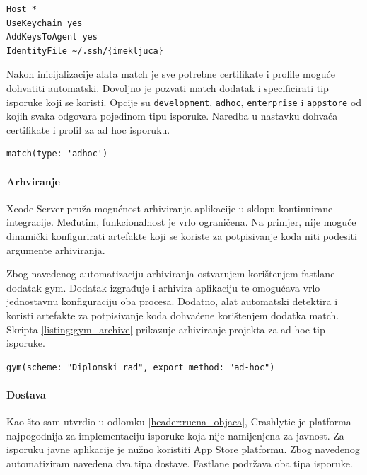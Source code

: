 \documentclass[times, utf8, diplomski, numeric]{fer}
\begin{document}
\begin{appendices}
\begin{lstlisting}[caption=Postavke SSH protokola za alat match, label=listing:SSH_match]
Host *
UseKeychain yes
AddKeysToAgent yes
IdentityFile ~/.ssh/{imekljuca}
\end{lstlisting}

Nakon inicijalizacije alata match je sve potrebne certifikate i profile moguće dohvatiti automatski. Dovoljno je pozvati match dodatak i specificirati tip isporuke koji se koristi. Opcije su \verb|development|, \verb|adhoc|, \verb|enterprise| i \verb|appstore| od kojih svaka odgovara pojedinom tipu isporuke. Naredba u nastavku dohvaća certifikate i profil za ad hoc isporuku.

\begin{lstlisting}[caption=Dohvćanje artefakta pomoću dodatka match za ad hoc isporuku]
match(type: 'adhoc')
\end{lstlisting}

\paragraph{Arhviranje}

Xcode Server pruža mogućnost arhiviranja aplikacije u sklopu kontinuirane integracije. Međutim, funkcionalnost je vrlo ograničena. Na primjer, nije moguće dinamički konfigurirati artefakte koji se koriste za potpisivanje koda niti podesiti argumente arhiviranja.

Zbog navedenog automatizaciju arhiviranja ostvarujem korištenjem fastlane dodatak gym. Dodatak izgrađuje i arhivira aplikaciju te omogućava vrlo jednostavnu konfiguraciju oba procesa. Dodatno, alat automatski detektira i koristi artefakte za potpisivanje koda dohvaćene korištenjem dodatka match. Skripta \ref{listing:gym_archive} prikazuje arhiviranje projekta za ad hoc tip isporuke.

\begin{lstlisting}[caption=Arhiviranje aplikacije za ad hoc isporuku pomoću dodatka gym, label=listing:gym_archive]
gym(scheme: "Diplomski_rad", export_method: "ad-hoc")
\end{lstlisting}

\paragraph{Dostava}

Kao što sam utvrdio u odlomku \ref{header:rucna_objaca}, Crashlytic je platforma najpogodnija za implementaciju isporuke koja nije namijenjena za javnost. Za isporuku javne aplikacije je nužno koristiti App Store platformu. Zbog navedenog automatiziram navedena dva tipa dostave. Fastlane podržava oba tipa isporuke.


\end{appendices}
\end{document}
